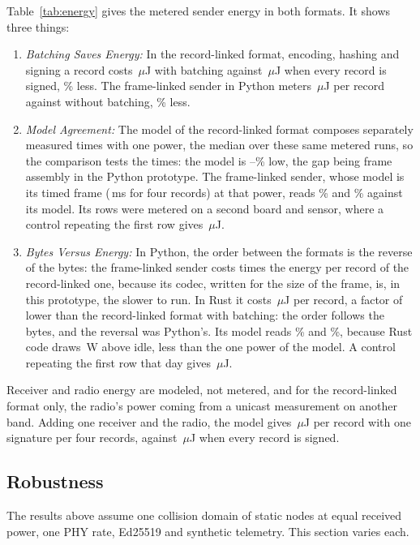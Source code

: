 \documentclass[lineno,pdflatex,sn-mathphys-num]{sn-jnl}
\newcommand{\runin}[1]{\textit{#1:}}
\renewcommand{\_}{\authbcunderscore\allowbreak}
\begin{document}
Table~\ref{tab:energy} gives the metered sender energy in both formats. It shows three things:
\begin{enumerate}
\item \runin{Batching Saves Energy} In the record-linked format, encoding, hashing and signing a
record costs \enDesignMeas\,$\mu$J with batching against \enBaseMeas\,$\mu$J when every record is
signed, \enSavePct\% less. The frame-linked sender in Python meters \enLeanMeas\,$\mu$J per record
against \enLeanOneMeas{} without batching, \enLeanSavePct\% less.
\item \runin{Model Agreement} The model of the record-linked format composes separately measured
times with one power, the median over these same metered runs, so the comparison tests the
times: the model is \enDesignGap--\enBaseGap\% low, the gap being frame assembly in the Python
prototype. The frame-linked sender, whose model is its timed frame (\leanSendMs\,ms for four
records) at that power, reads \enLeanGap\% and \enLeanOneGap\% against its model. Its rows were
metered on a second board and sensor, where a control repeating the first row gives
\enCtlMeas\,$\mu$J.
\item \runin{Bytes Versus Energy} In Python, the order between the formats is the reverse of the
bytes: the frame-linked sender costs \enLeanOverFirst{} times the energy per record of the
record-linked one, because its codec, written for the size of the frame, is, in this prototype,
the slower to run. In Rust it costs \enRustMeas\,$\mu$J per record, a factor of \enFirstOverRust{}
lower than the record-linked format with batching: the order follows the bytes, and the reversal
was Python's. Its model reads \enRustGap\% and \enRustOneGap\%, because Rust code draws
\enRustPower\,W above idle, less than the one power of the model. A control repeating the first
row that day gives \enCtlNewMeas\,$\mu$J.
\end{enumerate}
Receiver and radio energy are modeled, not metered, and for the record-linked format only, the
radio's power coming from a unicast measurement on another band. Adding one receiver and the
radio, the model gives \enDesignEndToEnd\,$\mu$J per record with one signature per four records,
against \enBaseEndToEnd\,$\mu$J when every record is signed.

\subsection{Robustness}\label{sec:robust}
The results above assume one collision domain of static nodes at equal received power, one PHY
rate, Ed25519 and synthetic telemetry. This section varies each.
\end{document}
